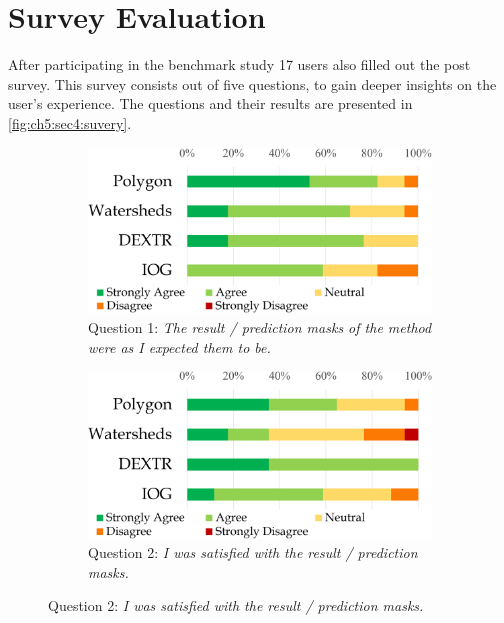 
\section{Survey Evaluation}\label{ord:ch5:sec4_survey}
After participating in the benchmark study 17 users also filled out the post survey.
This survey consists out of five questions, to gain deeper insights on the user's experience.
The questions and their results are presented in \ref{fig:ch5:sec4:suvery}.

\begin{figure}
	\centering
	\begin{subfigure}[t]{0.48\textwidth}
		\centering
		\includegraphics[width=\textwidth]{figures/chap54_q1.png}
		\caption{
			Question 1: \textit{The result / prediction masks of the method were as I expected them to be.}
		} \label{fig:ch5:sec4:q1}
	\end{subfigure}
	\hfill
	\begin{subfigure}[t]{0.48\textwidth}
		\centering
		\includegraphics[width=\textwidth]{figures/chap54_q2.png}
		\caption{
			Question 2: \textit{I was satisfied with the result / prediction masks.}
}
\end{subfigure}
\end{figure}
